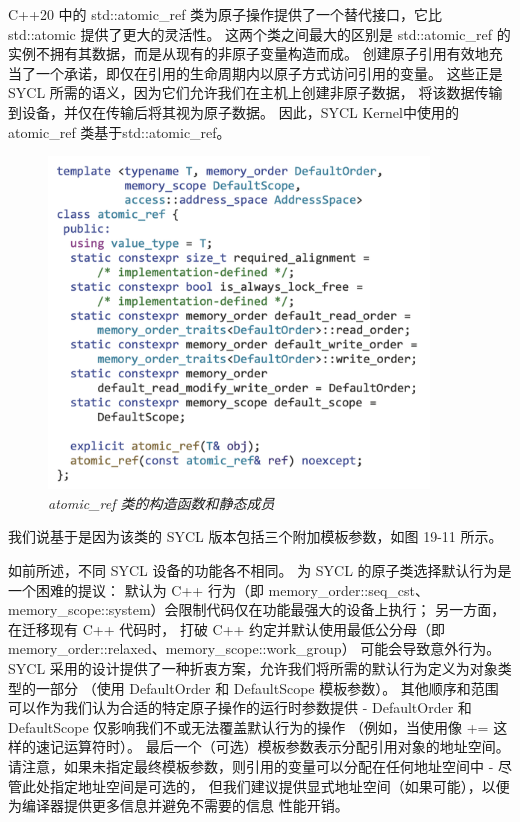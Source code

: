 C++20 中的 std::atomic\_ref 类为原子操作提供了一个替代接口，它比 std::atomic 提供了更大的灵活性。 
这两个类之间最大的区别是 std::atomic\_ref 的实例不拥有其数据，而是从现有的非原子变量构造而成。 
创建原子引用有效地充当了一个承诺，即仅在引用的生命周期内以原子方式访问引用的变量。 
这些正是 SYCL 所需的语义，因为它们允许我们在主机上创建非原子数据，
将该数据传输到设备，并仅在传输后将其视为原子数据。 
因此，SYCL Kernel中使用的atomic\_ref 类基于std::atomic\_ref。

\begin{figure}[H]
	\centering
	\includegraphics[width=0.9\textwidth]{figs/F19.11.png}
	\caption{\textit{atomic\_ref 类的构造函数和静态成员 }}
\end{figure}

我们说基于是因为该类的 SYCL 版本包括三个附加模板参数，如图 19-11 所示。

如前所述，不同 SYCL 设备的功能各不相同。 
为 SYCL 的原子类选择默认行为是一个困难的提议：
默认为 C++ 行为（即 memory\_order::seq\_cst、memory\_scope::system）会限制代码仅在功能最强大的设备上执行； 
另一方面，在迁移现有 C++ 代码时，
打破 C++ 约定并默认使用最低公分母（即 memory\_order::relaxed、memory\_scope::work\_group）
可能会导致意外行为。 
SYCL 采用的设计提供了一种折衷方案，允许我们将所需的默认行为定义为对象类型的一部分
（使用 DefaultOrder 和 DefaultScope 模板参数）。 
其他顺序和范围可以作为我们认为合适的特定原子操作的运行时参数提供
 - DefaultOrder 和 DefaultScope 仅影响我们不或无法覆盖默认行为的操作
 （例如，当使用像 += 这样的速记运算符时）。 最后一个（可选）模板参数表示分配引用对象的地址空间。 
 请注意，如果未指定最终模板参数，则引用的变量可以分配在任何地址空间中 - 尽管此处指定地址空间是可选的，
 但我们建议提供显式地址空间（如果可能），以便为编译器提供更多信息并避免不需要的信息 性能开销。

